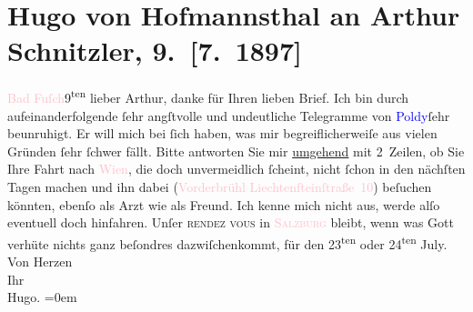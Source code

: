 

               \section[Hugo von Hofmannsthal an Arthur Schnitzler, 9. {[}7. 1897{]}]{ Hugo von Hofmannsthal an Arthur Schnitzler, 9. {[}7. 1897{]}}\nopagebreak{}\rehead{ }\normalsize\beginnumbering{} \toendnotes[C]{\smallbreak\pagebreak[2]} 
\pstart
           \raggedleft{}{\pb}\textcolor{pink}{Bad Fuſch}{}\ledrightnote{\textcolor{pink}{Bad Fusch}}{ }9\textsuperscript{ten}\pend
           \pstart
           lieber Arthur, danke für Ihren lieben Brief. Ich bin durch
                    aufeinanderfolgende ſehr angſtvolle und undeutliche Telegramme von \textcolor{blue}{Poldy}{}\ledrightnote{\textcolor{blue}{Leopold von Andrian-Werburg}}{ }ſehr beunruhigt. Er will mich bei ſich
                    haben, was mir begreiflicherweiſe aus vielen Gründen ſehr ſchwer fällt. Bitte
                    antworten Sie mir \uline{umgehend} mit 2 Zeilen, ob Sie
                    Ihre Fahrt nach \textcolor{pink}{Wien}{}\ledrightnote{\textcolor{pink}{Wien}}, die doch unvermeidlich
                    ſcheint, nicht ſchon in den nächſten {\pb}Tagen machen und ihn dabei
                        (\textcolor{pink}{Vorderbrühl Liechtenſteinſtraße 10}{}\ledrightnote{\textcolor{pink}{Liechtensteinstraße}})
                    beſuchen könnten, ebenſo als Arzt wie als Freund. Ich kenne mich nicht aus,
                    werde alſo eventuell doch hinfahren.\pend
           \pstart
           Unſer \textsc{rendez vous} in \textcolor{pink}{\textsc{Salzburg}}{}\ledrightnote{\textcolor{pink}{Salzburg}} bleibt, wenn was Gott verhüte nichts ganz beſondres
                    dazwiſchenkommt, für den 23\textsuperscript{ten} oder 24\textsuperscript{ten} July.\pend
           \pstart
           Von Herzen{\\[\baselineskip]}Ihr{\\[\baselineskip]}\spacefill\mbox{Hugo.}\pend
           \leftskip=0em{}\endnumbering{}  
      